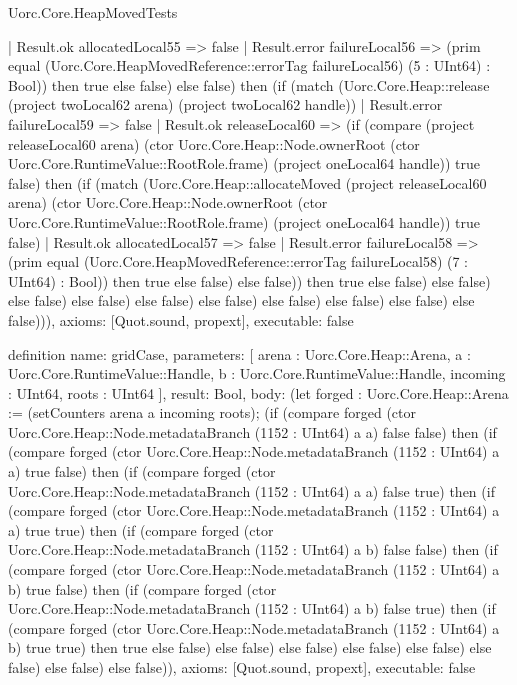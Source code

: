 \begin{lexlean}{Uorc.Core.HeapMovedTests}
\begin{semanticmodule}
{        | Result.ok allocatedLocal55 => false
        | Result.error failureLocal56 => (prim equal (Uorc.Core.HeapMovedReference::errorTag failureLocal56) (5 : UInt64) : Bool)) then true else false) else false) then (if (match (Uorc.Core.Heap::release (project twoLocal62 arena) (project twoLocal62 handle))
        | Result.error failureLocal59 => false
        | Result.ok releaseLocal60 => (if (compare (project releaseLocal60 arena) (ctor Uorc.Core.Heap::Node.ownerRoot (ctor Uorc.Core.RuntimeValue::RootRole.frame) (project oneLocal64 handle)) true false) then (if (match (Uorc.Core.Heap::allocateMoved (project releaseLocal60 arena) (ctor Uorc.Core.Heap::Node.ownerRoot (ctor Uorc.Core.RuntimeValue::RootRole.frame) (project oneLocal64 handle)) true false)
          | Result.ok allocatedLocal57 => false
          | Result.error failureLocal58 => (prim equal (Uorc.Core.HeapMovedReference::errorTag failureLocal58) (7 : UInt64) : Bool)) then true else false) else false)) then true else false) else false) else false) else false) else false) else false) else false) else false) else false) else false))),
  axioms: [Quot.sound, propext],
  executable: false
}

definition{
  name: gridCase,
  parameters: [
    arena : Uorc.Core.Heap::Arena,
    a : Uorc.Core.RuntimeValue::Handle,
    b : Uorc.Core.RuntimeValue::Handle,
    incoming : UInt64,
    roots : UInt64
  ],
  result: Bool,
  body: (let forged : Uorc.Core.Heap::Arena := (setCounters arena a incoming roots); (if (compare forged (ctor Uorc.Core.Heap::Node.metadataBranch (1152 : UInt64) a a) false false) then (if (compare forged (ctor Uorc.Core.Heap::Node.metadataBranch (1152 : UInt64) a a) true false) then (if (compare forged (ctor Uorc.Core.Heap::Node.metadataBranch (1152 : UInt64) a a) false true) then (if (compare forged (ctor Uorc.Core.Heap::Node.metadataBranch (1152 : UInt64) a a) true true) then (if (compare forged (ctor Uorc.Core.Heap::Node.metadataBranch (1152 : UInt64) a b) false false) then (if (compare forged (ctor Uorc.Core.Heap::Node.metadataBranch (1152 : UInt64) a b) true false) then (if (compare forged (ctor Uorc.Core.Heap::Node.metadataBranch (1152 : UInt64) a b) false true) then (if (compare forged (ctor Uorc.Core.Heap::Node.metadataBranch (1152 : UInt64) a b) true true) then true else false) else false) else false) else false) else false) else false) else false) else false)),
  axioms: [Quot.sound, propext],
  executable: false
}


\end{semanticmodule}
\end{lexlean}
